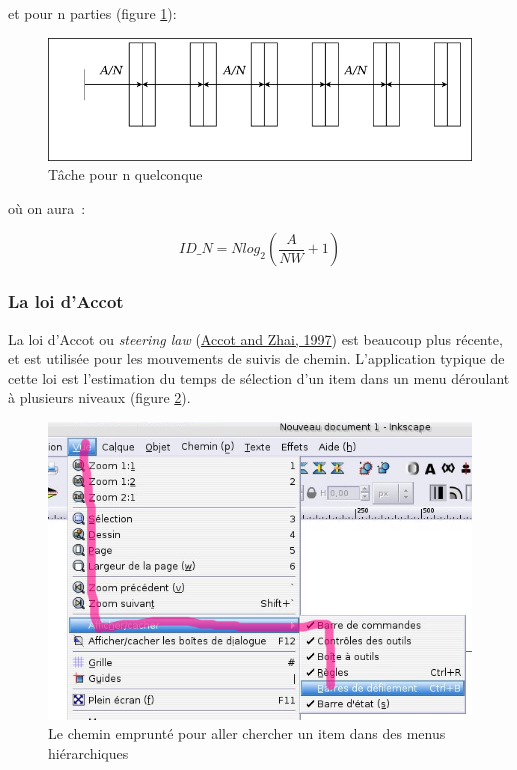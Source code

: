 \documentclass[
]{book}
\begin{document}
et pour n parties (figure \ref{fig:Tachepourn}):

\begin{figure}
\centering
\includegraphics{img/fitts3.png}
\caption{\label{fig:Tachepourn}Tâche pour n quelconque}
\end{figure}

où on aura~:

\[ ID\_{N}=Nlog_{2}\left(\frac{A}{NW}+1\right)\]

\hypertarget{la-loi-daccot}{%
\subsubsection{La loi d'Accot}\label{la-loi-daccot}}

La loi d'Accot ou \emph{steering law} (\protect\hyperlink{ref-accot1997beyond}{Accot and Zhai, 1997}) est beaucoup plus récente, et
est utilisée pour les mouvements de suivis de chemin. L'application typique
de cette loi est l'estimation du temps de sélection d'un item dans un menu
déroulant à plusieurs niveaux (figure \ref{fig:Lecheminemprunte}).

\begin{figure}
\centering
\includegraphics{img/menu_accot.png}
\caption{\label{fig:Lecheminemprunte}Le chemin emprunté pour aller chercher
un item dans des menus hiérarchiques}
\end{figure}
\end{document}
